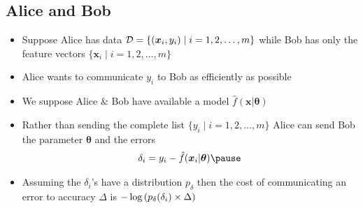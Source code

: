
\begin{slide}
\section{Alice and Bob}
  
\begin{PauseHighLight}
  \begin{itemize}
  \item Suppose Alice has data
    $\mathcal{D}=\{(\bm{x}_i,y_i) \mid i=1,2,\ldots,m\}$ while Bob  has only  the
    feature vectors $\{\bm{x}_i \mid i=1,2,\ldots,m\}$\pause
  \item Alice wants to communicate $y_i$ to Bob as efficiently as
    possible\pause
  \item We suppose Alice \& Bob have available a model
    $\hat{f}(\bm{x}|\bm{\theta})$\pause
  \item Rather than sending the complete list $\{y_i \mid
      i=1,2,\ldots,m\}$ Alice can send Bob the parameter
      $\bm{\theta}$ and the errors
      \begin{align*}
        \delta_i = y_i - \hat{f}(\bm{x}_i|\bm{\theta})\pause
      \end{align*}
    \item Assuming the $\delta_i$'s have a distribution $p_\delta$
      then the cost of communicating an error to accuracy $\Delta$ is
      $-\log\left( p_\delta(\delta_i)\times\Delta \right)$\pause
  \end{itemize}
\end{PauseHighLight}

\end{slide}


